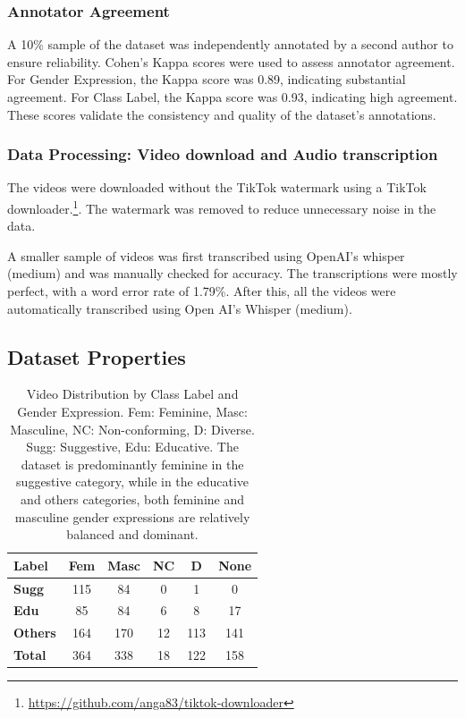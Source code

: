 \documentclass[11pt]{article}
\begin{document}
\subsubsection*{Annotator Agreement}

A 10\% sample of the dataset was independently annotated by a second author to ensure reliability. Cohen's Kappa scores \citep{cohen1960coefficient} were used to assess annotator agreement. For Gender Expression, the Kappa score was 0.89, indicating substantial agreement. For Class Label, the Kappa score was 0.93, indicating high agreement. These scores validate the consistency and quality of the dataset's annotations.

\subsubsection*{Data Processing: Video download and Audio transcription}

The videos were downloaded without the TikTok watermark using a TikTok downloader.\footnote{\url{https://github.com/anga83/tiktok-downloader}}. The watermark was removed  to reduce unnecessary noise in the data.  

A smaller sample of videos was first transcribed using OpenAI’s whisper (medium) \citep{radford2022robust} and was manually checked for accuracy.  The transcriptions were mostly perfect, with a word error rate of 1.79\%. After this, all the videos were automatically transcribed using Open AI's Whisper (medium).  

\subsection{Dataset Properties}
\begin{small}
\begin{table}

\centering
\begin{tabular}{lccccc}
\hline
\textbf{Label} &  \textbf{Fem} & \textbf{Masc} & \textbf{NC} & \textbf{D} & \textbf{None}\\
\hline
\textbf{Sugg} & 115 & 84	& 0	& 1 & 0\\
\textbf{Edu} & 85 & 84 & 6 & 8 & 17\\
\textbf{Others} & 164 & 170 & 12 & 113 & 141\\
\hline
\textbf{Total} & 364 & 338 & 18 & 122 & 158\\
\hline
\end{tabular}
\caption{Video Distribution by Class Label and Gender Expression. Fem: Feminine, Masc: Masculine, NC: Non-conforming, D: Diverse. Sugg: Suggestive, Edu: Educative. The dataset is predominantly feminine in the suggestive category, while in the educative and others categories, both feminine and masculine gender expressions are relatively balanced and dominant.}

\end{table}
\end{small}
\end{document}
